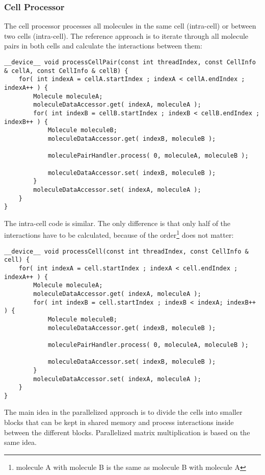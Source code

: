 \subsubsection{Cell Processor}
The cell processor processes all molecules in the same cell (intra-cell) or between two cells (intra-cell).
The reference approach is to iterate through all molecule pairs in both cells and calculate the interactions between them:
\begin{lstlisting}[label=intercellreferenceloop,caption=Reference Inter-Cell Block Processing]
__device__ void processCellPair(const int threadIndex, const CellInfo & cellA, const CellInfo & cellB) {
	for( int indexA = cellA.startIndex ; indexA < cellA.endIndex ; indexA++ ) {
		Molecule moleculeA;
		moleculeDataAccessor.get( indexA, moleculeA );
		for( int indexB = cellB.startIndex ; indexB < cellB.endIndex ; indexB++ ) {
			Molecule moleculeB;
			moleculeDataAccessor.get( indexB, moleculeB );

			moleculePairHandler.process( 0, moleculeA, moleculeB );

			moleculeDataAccessor.set( indexB, moleculeB );
		}
		moleculeDataAccessor.set( indexA, moleculeA );
	}
}
\end{lstlisting}
The intra-cell code is similar. The only difference is that only half of the interactions have to be calculated, because of the order\footnote{molecule A with molecule B is the same as molecule B with molecule A} does not matter:
\begin{lstlisting}[label=intracellreferenceloop,caption=Reference Intra-Cell Block Processing]
__device__ void processCell(const int threadIndex, const CellInfo & cell) {
	for( int indexA = cell.startIndex ; indexA < cell.endIndex ; indexA++ ) {
		Molecule moleculeA;
		moleculeDataAccessor.get( indexA, moleculeA );
		for( int indexB = cell.startIndex ; indexB < indexA; indexB++ ) {
			Molecule moleculeB;
			moleculeDataAccessor.get( indexB, moleculeB );

			moleculePairHandler.process( 0, moleculeA, moleculeB );

			moleculeDataAccessor.set( indexB, moleculeB );
		}
		moleculeDataAccessor.set( indexA, moleculeA );
	}
}
\end{lstlisting}

The main idea in the parallelized approach is to divide the cells into smaller blocks that can be kept in shared memory and process interactions inside between the different blocks. Parallelized matrix multiplication is based on the same idea. 


